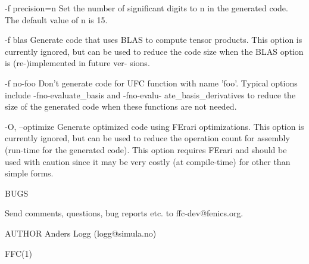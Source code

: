        -f precision=n
              Set the number of significant digits to n in the generated code.
              The default value of n is 15.

       -f blas
              Generate code that uses BLAS to compute tensor  products.   This
              option  is currently ignored, but can be used to reduce the code
              size when the BLAS option is  (re-)implemented  in  future  ver-
              sions.

       -f no-foo
              Don't  generate  code  for UFC function with name 'foo'. Typical
              options    include    -fno-evaluate_basis    and     -fno-evalu-
              ate_basis_derivatives  to  reduce the size of the generated code
              when these functions are not needed.

       -O, --optimize
              Generate optimized code using FErari optimizations. This  option
              is  currently  ignored,  but can be used to reduce the operation
              count for assembly  (run-time  for  the  generated  code).  This
              option  requires FErari and should be used with caution since it
              may be very costly  (at  compile-time)  for  other  than  simple
              forms.



       BUGS

       Send comments, questions, bug reports etc. to ffc-dev@fenics.org.


AUTHOR
       Anders Logg (logg@simula.no)



                                                                        FFC(1)
